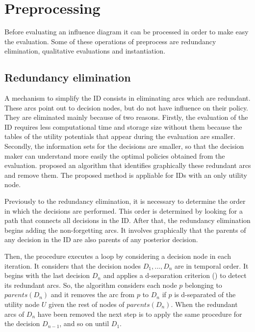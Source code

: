                       


\section{Preprocessing}

Before evaluating an influence diagram it can be processed in order to make
easy the evaluation. Some of these operations of preprocess are redundancy
elimination, qualitative evaluations and instantiation.

\subsection{Redundancy elimination}

A mechanism to simplify the ID consists in eliminating arcs which are
redundant. These arcs point out to decision nodes, but do not have influence
on their policy. They are eliminated mainly because of two reasons. Firstly,
the evaluation of the ID requires less computational time and storage size
without them because the tables of the utility potentials that appear during
the evaluation are smaller. Secondly, the information sets for the decisions
are smaller, so that the decision maker can understand more easily the
optimal policies obtained from the evaluation. \cite{faguiouli98} proposed
an algorithm that identifies graphically these redundant arcs and remove
them. The proposed method is appliable for IDs with an only utility node.

Previously to the redundancy elimination, it is necessary to determine the
order in which the decisions are performed. This order is determined by
looking for a path that connects all decisions in the ID. After that, the
redundancy elimination begins adding the non-forgetting arcs. It involves
graphically that the parents of any decision in the ID are also parents of
any posterior decision.

Then, the procedure executes a loop by considering a decision node in each
iteration. It considers that the decision nodes $D_{1},...,D_{n}$ are in
temporal order. It begins with the last decision $D_{n}$ and applies a
d-separation criterion (\cite{pearl88}) to detect its redundant arcs. So,
the algorithm considers each node $p$ belonging to $parents(D_{n})$ and it
removes the arc from $p$ to $D_{n}$ if $p$ is d-separated of the utility
node $U$ given the rest of nodes of $parents(D_{n})$. When the redundant
arcs of $D_{n}$ have been removed the next step is to apply the same
procedure for the decision $D_{n-1}$, and so on until $D_{1}$.

